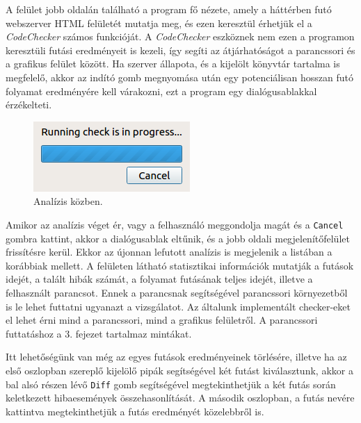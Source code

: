 \documentclass[a4paper,12pt]{report}
\begin{document}
A felület jobb oldalán található a program fő nézete, amely a háttérben futó webszerver HTML felületét mutatja meg, és ezen keresztül érhetjük el a \emph{CodeChecker} számos funkcióját. A \emph{CodeChecker} eszköznek nem ezen a programon keresztüli futási eredményeit is kezeli, így segíti az átjárhatóságot a parancssori és a grafikus felület között. Ha szerver állapota, és a kijelölt könyvtár tartalma is megfelelő, akkor az indító gomb megnyomása után egy potenciálisan hosszan futó folyamat eredményére kell várakozni, ezt a program egy dialógusablakkal érzékelteti.

\begin{figure}[h]
\caption{Analízis közben.}
\centering
\includegraphics[scale=0.8]{progress_bar.png}
\end{figure}

Amikor az analízis véget ér, vagy a felhasználó meggondolja magát és a \texttt{Cancel} gombra kattint, akkor a dialógusablak eltűnik, és a jobb oldali megjelenítőfelület frissítésre kerül. Ekkor az újonnan lefutott analízis is megjelenik a listában a korábbiak mellett. A felületen látható statisztikai információk mutatják a futások idejét, a talált hibák számát, a folyamat futásának teljes idejét, illetve a felhasznált parancsot. Ennek a parancsnak segítségével parancssori környezetből is le lehet futtatni ugyanazt a vizsgálatot. Az általunk implementált checker-eket el lehet érni mind a parancssori, mind a grafikus felületről. A parancssori futtatáshoz a 3. fejezet tartalmaz mintákat. 

Itt lehetőségünk van még az egyes futások eredményeinek törlésére, illetve ha az első oszlopban szereplő kijelölő pipák segítségével két futást kiválasztunk, akkor a bal alsó részen lévő \texttt{Diff} gomb segítségével megtekinthetjük a két futás során keletkezett hibaesemények összehasonlítását. A második oszlopban, a futás nevére kattintva megtekinthetjük a futás eredményét közelebbről is.
\end{document}
